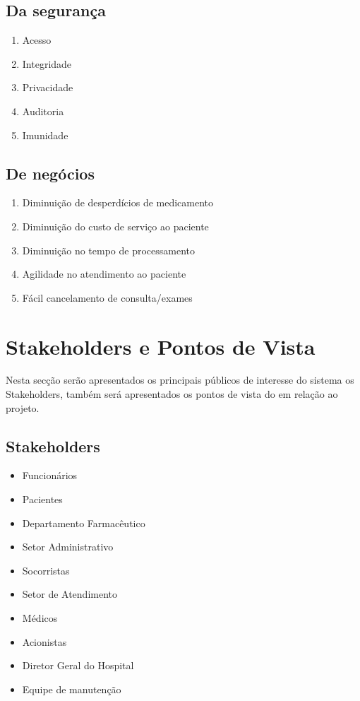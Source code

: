 \subsection{Da segurança}

\begin{enumerate}
  \item Acesso
  \item Integridade
  \item Privacidade
  \item Auditoria
  \item Imunidade
\end{enumerate}


\subsection{De negócios}

\begin{enumerate}
  \item Diminuição de desperdícios de medicamento
  \item Diminuição do custo de serviço ao paciente
  \item Diminuição no tempo de processamento
  \item Agilidade no atendimento ao paciente
  \item Fácil cancelamento de consulta/exames
\end{enumerate}

 
  
\section{Stakeholders e Pontos de Vista}

Nesta secção serão apresentados os principais públicos de interesse do sistema os Stakeholders, também será apresentados os pontos de vista do em relação ao projeto.

\subsection{Stakeholders}

\begin{itemize}
  \item Funcionários
  \item Pacientes
  \item Departamento Farmacêutico
  \item Setor Administrativo
  \item Socorristas
  \item Setor de Atendimento
  \item Médicos
  \item Acionistas
  \item Diretor Geral do Hospital
  \item Equipe de manutenção
\end{itemize}
